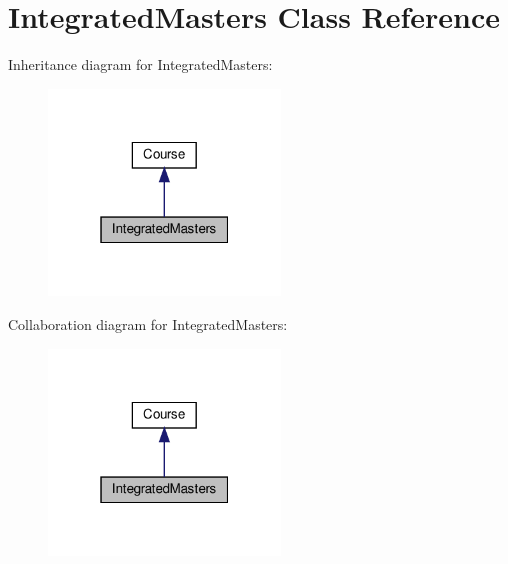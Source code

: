 \hypertarget{classIntegratedMasters}{}\section{Integrated\+Masters Class Reference}
\label{classIntegratedMasters}


Inheritance diagram for Integrated\+Masters\+:\nopagebreak
\begin{figure}[H]
\begin{center}
\leavevmode
\includegraphics[width=175pt]{classIntegratedMasters__inherit__graph}
\end{center}
\end{figure}


Collaboration diagram for Integrated\+Masters\+:\nopagebreak
\begin{figure}[H]
\begin{center}
\leavevmode
\includegraphics[width=175pt]{classIntegratedMasters__coll__graph}
\end{center}
\end{figure}
